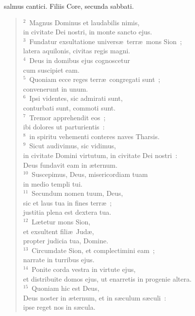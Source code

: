 \bchapter[Psalm]
salmus cantici. Filiis Core, secunda sabbati.
\begin{verse}${}^{2}$~Magnus Dominus et laudabilis nimis,\\ in civitate Dei nostri, in monte sancto ejus.\\
${}^{3}$~Fundatur exsultatione univers\ae\ terr\ae\ mons Sion~;\\ latera aquilonis, civitas regis magni.\\
${}^{4}$~Deus in domibus ejus cognoscetur\\ cum suscipiet eam.\\
${}^{5}$~Quoniam ecce reges terr\ae\ congregati sunt~;\\ convenerunt in unum.\\
${}^{6}$~Ipsi videntes, sic admirati sunt,\\ conturbati sunt, commoti sunt.\\
${}^{7}$~Tremor apprehendit eos~;\\ ibi dolores ut parturientis~:\\
${}^{8}$~in spiritu vehementi conteres naves Tharsis.\\
${}^{9}$~Sicut audivimus, sic vidimus,\\ in civitate Domini virtutum, in civitate Dei nostri~:\\ Deus fundavit eam in \ae ternum.\\
${}^{10}$~Suscepimus, Deus, misericordiam tuam\\ in medio templi tui.\\
${}^{11}$~Secundum nomen tuum, Deus,\\ sic et laus tua in fines terr\ae~;\\ justitia plena est dextera tua.\\
${}^{12}$~L\ae tetur mons Sion,\\ et exsultent fili\ae\ Jud\ae ,\\ propter judicia tua, Domine.\\
${}^{13}$~Circumdate Sion, et complectimini eam~;\\ narrate in turribus ejus.\\
${}^{14}$~Ponite corda vestra in virtute ejus,\\ et distribuite domos ejus, ut enarretis in progenie altera.\\
${}^{15}$~Quoniam hic est Deus,\\ Deus noster in \ae ternum, et in s\ae culum s\ae culi~:\\ ipse reget nos in s\ae cula.\end{verse}



